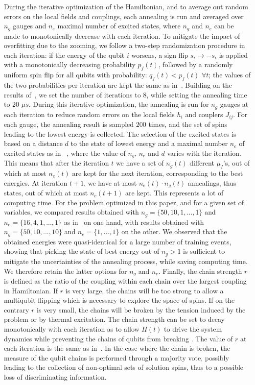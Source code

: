 \documentclass{article}
\begin{document}
During the iterative optimization of the Hamiltonian, and to average out 
random errors on the local fields and couplings, each annealing is run and 
averaged over $n_g$ gauges \cite{gauge} and $n_e$ maximal number of 
excited states, where $n_g$ and $n_e$ can be made to monotonically 
decrease with each iteration. To mitigate the impact of overfitting due 
to the zooming, we follow a two-step randomization procedure in each 
iteration: if the energy of the qubit $i$ worsens, a sign flip $s_i 
\rightarrow -s_i$ is applied with a monotonically decreasing probability 
$p_f(t)$, followed by a randomly uniform spin flip for all qubits with 
probability: $q_f(t) < p_f(t)$ $\forall t$; the values of the two 
probabilities per iteration are kept the same as in~\cite{qamlz}. Building 
on the results of~\cite{nature,qamlz}, we set the number of iterations to 
8, while setting the annealing time to 20 $\mu s$. During this iterative 
optimization, the annealing is run for $n_g$ gauges at each iteration to 
reduce random errors on the local fields $h_i$ and couplers $J_{ij}$. For 
each gauge, the annealing result is sampled 200 times, and the set of 
spins leading to the lowest energy is collected. The selection of the 
excited states is based on a distance $d$ to the state of lowest energy 
and a maximal number $n_e$ of excited states as in ~\cite{qamlz}, where 
the value of $n_g$, $n_e$ and $d$ varies with the iteration. This means 
that after the iteration $t$ we have a set of $n_g(t)$ different 
$\mu_I$'s, out of which at most $n_e(t)$ are kept for the next iteration, 
corresponding to the best energies. At iteration $t+1$, we have at most 
$n_e(t) \cdot n_g(t)$ annealings, thus states, out of which at most 
$n_e(t+1)$ are kept. This represents a lot of computing time. For the 
problem optimized in this paper, and for a given set of variables, we 
compared results obtained with $n_g=\{50,10,1,...,1\}$ and 
$n_e=\{16,4,1,...,1\}$ as in~\cite{qamlz} on one hand, with results 
obtained with $n_g=\{50,10,...,10\}$ and $n_e=\{1,...,1\}$ on the other. 
We observed that the obtained energies were quasi-identical for a large 
number of training events, showing that picking the state of best energy 
out of $n_g > 1$ is sufficient to mitigate the uncertainties of the 
annealing process, while saving computing time. We therefore retain the 
latter options for $n_g$ and $n_e$. Finally, the chain strength $r$ is 
defined as the ratio of the coupling within each chain over the largest 
coupling in Hamiltonian. If $r$ is very large, the chains will be too 
strong to allow a multiqubit flipping which is necessary to explore the 
space of spins. If on the contrary $r$ is very small, the chains will be 
broken by the tension induced by the problem or by thermal excitation. The 
chain strength can be set to decay monotonically with each iteration as to 
allow $H(t)$ to drive the system dynamics while preventing the chains of 
qubits from breaking \cite{cstrength}. The value of $r$ at each iteration 
is the same as in~\cite{qamlz}. In the case where the chain is broken, the 
measure of the qubit chains is performed through a majority vote, possibly 
leading to the collection of non-optimal sets of solution spins, thus to a 
possible loss of discriminating information.
\end{document}
